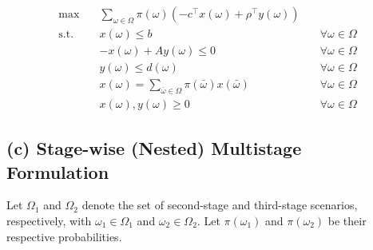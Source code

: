 \documentclass[8pt]{article}
\begin{document}
\begin{subequations}
    \begin{align}
        \max \quad & \sum_{\omega \in \Omega} \pi(\omega) \left( -c^\top x(\omega) + \rho^\top y(\omega) \right) \\
        \text{s.t.} \quad
                   & x(\omega) \leq b
                   & \quad \forall \omega \in \Omega                                                             \\
                   & -x(\omega) + Ay(\omega) \leq 0
                   & \quad \forall \omega \in \Omega                                                             \\
                   & y(\omega) \leq d(\omega)
                   & \quad \forall \omega \in \Omega                                                             \\
                   & x(\omega) = \sum_{\bar{\omega} \in \Omega}\pi(\bar{\omega})x(\bar{\omega})
                   & \quad \forall \omega \in \Omega                                                             \\
                   & x(\omega), y(\omega) \geq 0
                   & \quad \forall \omega \in \Omega
    \end{align}
\end{subequations}

\subsection*{(c) Stage-wise (Nested) Multistage Formulation}
Let $\Omega_1$ and $\Omega_2$ denote the set of second-stage and third-stage
scenarios, respectively, with $\omega_1 \in \Omega_1$ and $\omega_2 \in
    \Omega_2$. Let $\pi(\omega_1)$ and $\pi(\omega_2)$ be their respective
probabilities.
\end{document}

